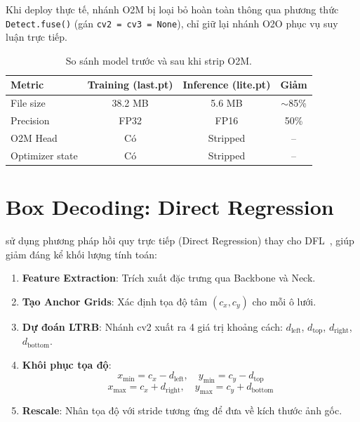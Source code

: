 Khi deploy thực tế, nhánh O2M bị loại bỏ hoàn toàn thông qua phương thức \texttt{Detect.fuse()} (gán \texttt{cv2 = cv3 = None}), chỉ giữ lại nhánh O2O phục vụ suy luận trực tiếp.

\begin{table}[H]
\centering
\caption{So sánh model trước và sau khi strip O2M.}
\label{tab:strip_o2m}
\begin{tabular}{lccc}
\toprule
\textbf{Metric} & \textbf{Training (last.pt)} & \textbf{Inference (lite.pt)} & \textbf{Giảm} \\
\midrule
File size & 38.2 MB & 5.6 MB & $\sim$85\% \\
Precision & FP32 & FP16 & 50\% \\
O2M Head & Có & Stripped & -- \\
Optimizer state & Có & Stripped & -- \\
\bottomrule
\end{tabular}
\end{table}

\section{Box Decoding: Direct Regression}
\label{sec:arch_box_decoding}

\yolo sử dụng phương pháp hồi quy trực tiếp (Direct Regression) thay cho DFL~\cite{dfl}, giúp giảm đáng kể khối lượng tính toán:

\begin{enumerate}[label=\textbf{Bước \arabic*:}]
    \item \textbf{Feature Extraction}: Trích xuất đặc trưng qua Backbone và Neck.
    \item \textbf{Tạo Anchor Grids}: Xác định tọa độ tâm $(c_x, c_y)$ cho mỗi ô lưới.
    \item \textbf{Dự đoán LTRB}: Nhánh cv2 xuất ra 4 giá trị khoảng cách: $d_\text{left}$, $d_\text{top}$, $d_\text{right}$, $d_\text{bottom}$.
    \item \textbf{Khôi phục tọa độ}:
    \begin{equation}
        x_\text{min} = c_x - d_\text{left}, \quad y_\text{min} = c_y - d_\text{top}
    \end{equation}
    \begin{equation}
        x_\text{max} = c_x + d_\text{right}, \quad y_\text{max} = c_y + d_\text{bottom}
    \end{equation}
    \item \textbf{Rescale}: Nhân tọa độ với stride tương ứng để đưa về kích thước ảnh gốc.
\end{enumerate}

